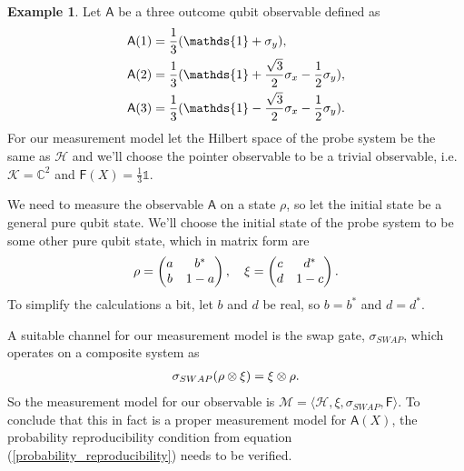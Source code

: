 \documentclass[a4paper,12pt]{wihuri}
\theoremstyle{definition}
\newtheorem{example}{Example}
\numberwithin{definition}{section}
\numberwithin{example}{section}
\numberwithin{theorem}{section}
\numberwithin{proposition}{section}
\numberwithin{lemma}{section}
\newcommand{\hi}{\mathcal{H}}%
\newcommand{\ki}{\mathcal{K}}%
\newcommand{\mm}{\mathcal{M}}%
\newcommand{\A}{\mathsf{A}}%
\newcommand{\F}{\mathsf{F}}%
\newcommand{\id}{\mathds{1}}
\newcommand{\cc}{\mathbb{C}^2}%
\begin{document}
\begin{example}
Let $\A$ be a three outcome qubit observable defined as
\begin{align*}
\A(1) &= \dfrac{1}{3}(\id + \sigma_y),\\
\A(2) &= \dfrac{1}{3}(\id + \dfrac{\sqrt{3}}{2}\sigma_x - \dfrac{1}{2}\sigma_y),\\
\A(3) &= \dfrac{1}{3}(\id - \dfrac{\sqrt{3}}{2}\sigma_x - \dfrac{1}{2}\sigma_y)\text.
\end{align*}
For our measurement model let the Hilbert space of the probe system be the same as $\hi$ and we'll choose the pointer observable to be a trivial observable, i.e. $\ki = \cc$ and $\F(X) = \frac{1}{3}\id$.

We need to measure the observable $\A$ on a state $\rho$, so let the initial state be a general pure qubit state. We'll choose the initial state of the probe system to be some other pure qubit state, which in matrix form are
\begin{align*}
\rho = \begin{pmatrix}
a & b^* \\
b & 1-a
\end{pmatrix},\quad \xi = \begin{pmatrix}
c & d^* \\
d & 1-c
\end{pmatrix}\text.
\end{align*}
To simplify the calculations a bit, let $b$ and $d$ be real, so $b = b^*$ and $d = d^*$.

A suitable channel for our measurement model is the swap gate, $\sigma_{SWAP}$, which operates on a composite system as
\begin{align*}
\sigma_{SWAP}(\rho \otimes \xi) = \xi \otimes \rho \text.
\end{align*} 
So the measurement model for our observable is $\mm = \langle \hi, \xi, \sigma_{SWAP}, \F \rangle$. To conclude that this in fact is a proper measurement model for $\A(X)$, the probability reproducibility condition from equation (\ref{probability_reproducibility}) needs to be verified. 


\end{example}
\end{document}
